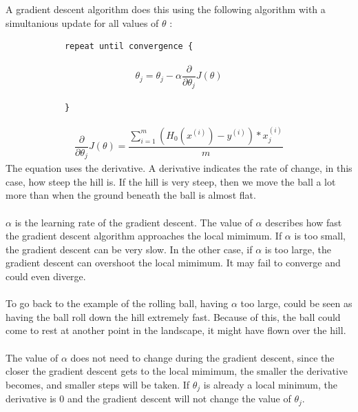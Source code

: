 \noindent A gradient descent algorithm does this using the following algorithm with a simultanious update for all values of $\theta$ \cite{stanford}:
\begin{lstlisting}
            repeat until convergence {
 \end{lstlisting}
\begin{align}
    \theta_j = \theta_j - \alpha\dfrac{\partial}{\partial \theta_j}J(\theta)
\end{align}
\begin{lstlisting}
            }
 \end{lstlisting}
\begin{align}
\dfrac{\partial}{\partial \theta_j}J(\theta) =  \dfrac{\sum\limits_{i=1}^m(H_0(x^{(i)}) - y^{(i)}) * x_j^{(i)}}{m}
 \end{align}
 The equation uses the derivative. A derivative indicates the rate of change, in this case, how steep the hill is. If the hill is very steep, then we move the ball a lot more than when the ground beneath the ball is almost flat.\\\\
 $\alpha$ is the learning rate of the gradient descent. The value of $\alpha$ describes how fast the gradient descent algorithm approaches the local mimimum. If $\alpha$ is too small, the gradient descent can be very slow. In the other case, if $\alpha$ is too large, the gradient descent can overshoot the local mimimum. It may fail to converge and could even diverge. \\\\ 
To go back to the example of the rolling ball, having $\alpha$ too large, could be seen as having the ball roll down the hill extremely fast. Because of this, the ball could come to rest at another point in the landscape, it might have flown over the hill. \\
 \\
The value of $\alpha$ does not need to change during the gradient descent, since the closer the gradient descent gets to the local mimimum, the smaller the derivative becomes, and smaller steps will be taken. If $\theta_j$ is already a local minimum, the derivative is $0$ and the gradient descent will not change the value of $\theta_j$. \cite{courseraLecturesGradient}

